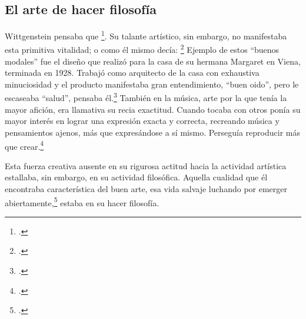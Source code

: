 \subsection{El arte de hacer filosofía}
Wittgenstein pensaba que
\footcite[p.~43e]{cnv}.
Su talante artístico, sin embargo, no manifestaba esta primitiva vitalidad; o
como él mismo decía:
\footcite[p.~29e]{cnv}
Ejemplo de estos ``buenos modales'' fue el diseño que realizó para la casa de su
hermana Margaret en Viena, terminada en 1928.
Trabajó como arquitecto de la casa con exhaustiva minuciosidad y el producto
manifestaba gran entendimiento, ``buen oido'', pero le escaseaba ``salud'',
pensaba él.\footcite[p.~43e]{cnv}
También en la música, arte por la que tenía la mayor afición, era llamativa su
recia exactitud. Cuando tocaba con otros ponía su mayor interés en lograr una
expresión exacta y correcta, recreando música y pensamientos ajenos, más que
expresándose a sí mismo. Perseguía reproducir más que
crear.\footcite[loc.˜]{monk}

Esta fuerza creativa ausente en su rigurosa actitud hacia la actividad artística
estallaba, sin embargo, en su actividad filosófica. Aquella cualidad que él
encontraba característica del buen arte, esa vida salvaje luchando por emerger
abiertamente,\footcite[cf.˜][loc.˜]{monk} estaba en su hacer filosofía.


